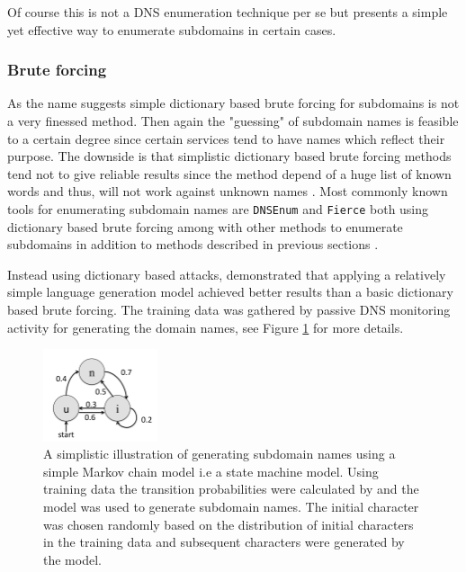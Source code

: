 Of course this is not a DNS enumeration technique per se but presents a simple yet effective way to enumerate subdomains in certain cases.

\subsubsection{Brute forcing}

As the name suggests simple dictionary based brute forcing for subdomains is not a very finessed method. Then again the "guessing" of subdomain names is feasible to a certain degree since certain services tend to have names which reflect their purpose. The downside is that simplistic dictionary based brute forcing methods tend not to give reliable results since the method depend of a huge list of known words and
thus, will not work against unknown names \cite{SMART_BRUTE}. Most commonly known tools for enumerating subdomain names are \texttt{DNSEnum} and \texttt{Fierce} both using dictionary based brute forcing among with other methods to enumerate subdomains in addition to methods described in previous sections \cite{SMART_BRUTE}\cite{hacking_exposed}.

Instead using dictionary based attacks, \citet{SMART_BRUTE} demonstrated that applying a relatively simple language generation model achieved better results than a basic dictionary based brute forcing. The training data was gathered by passive DNS monitoring activity for generating the domain names, see Figure \ref{fig:markov} for more details.


\begin{figure}[htb]
  \begin{center}
    \includegraphics[width=0.3\textwidth]{markov.png}
    \caption{A simplistic illustration of generating subdomain names using a simple Markov chain model i.e a state machine model. Using training data the transition probabilities were calculated by \citet{SMART_BRUTE} and the model was used to generate subdomain names. The initial character was chosen randomly based on the distribution of initial characters in the training data and subsequent characters were generated by the model.} 
    \label{fig:markov}
  \end{center}
\end{figure}

